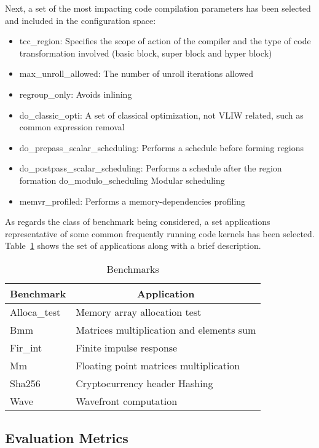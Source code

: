 Next, a set of the most impacting code compilation parameters has been
selected and included in the configuration space:
\begin{itemize}
\item{tcc\_region}: Specifies the scope of action of the compiler and the type
of code transformation involved (basic block, super block and hyper
block) 
\item {max\_unroll\_allowed}: The number of unroll iterations allowed
\item{regroup\_only}: Avoids inlining 
\item{do\_classic\_opti}: A set of classical optimization, not VLIW related,
such as common expression removal 
\item{do\_prepass\_scalar\_scheduling}: Performs a schedule before
forming regions 
\item{do\_postpass\_scalar\_scheduling}: Performs a schedule after the region formation 
do\_modulo\_scheduling  Modular scheduling 
\item{memvr\_profiled}: Performs a memory-dependencies profiling 
\end{itemize}

As regards the class of benchmark being considered, a set applications representative of some common
frequently running code kernels has been selected. Table~\ref{tab:bench} shows the set of applications
along with a brief description.
\begin{table}
	\centering
	\caption{Benchmarks}
	\label{tab:bench}
	\begin{tabular}{ll}
	\hline
	\multicolumn{1}{c}{Benchmark} & \multicolumn{1}{c}{Application} \\
	\hline
	Alloca\_test & Memory array allocation test \\
	Bmm & Matrices multiplication and elements sum \\
	Fir\_int & Finite impulse response \\
	Mm & Floating point matrices multiplication \\
	Sha256 & Cryptocurrency header Hashing \\
	Wave & Wavefront computation \\
	\hline
	\end{tabular}
\end{table}

\subsection{Evaluation Metrics}


